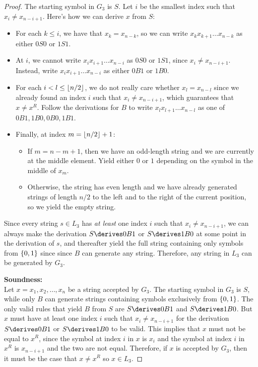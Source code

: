 \begin{Answer}
\begin{claim}
\begin{proof}
      \step
      The starting symbol in $G_3$ is $S$.
      Let $i$ be the smallest index such that $x_i \ne x_{n-i+1}$.
      Here's how we can derive $x$ from $S$:
      \begin{itemize}
        \item For each $k \le i$, we have that $x_k = x_{n-k}$,
          so we can write $x_k x_{k+1} \ldots x_{n-k}$ as either $0S0$ or $1S1$.
        \item At $i$, we cannot write $x_i x_{i+1} \ldots x_{n-i}$
          as $0S0$ or $1S1$, since $x_i \ne x_{n-i+1}$.
          Instead, write $x_i x_{i+1} \ldots x_{n-i}$ as either $0B1$ or $1B0$.
        \item For each $i < l \le \lfloor{} n/2 \rfloor$, we do not really care whether $x_l = x_{n-l}$
          since we already found an index $i$ such that $x_i \ne x_{n-i+1}$,
          which guarantees that $x \ne x^R$.
          Follow the derivations for $B$ to write $x_l x_{l+1} \ldots x_{n-l}$
          as one of $0B1, 1B0, 0B0, 1B1$.
        \item Finally, at index $m = \lfloor{} n/2 \rfloor + 1$:
          \begin{itemize}
            \item If $m = n - m + 1$, then we have an odd-length string
              and we are currently at the middle element. Yield either $0$ or $1$
              depending on the symbol in the middle of $x_m$.
            \item Otherwise, the string has even length
              and we have already generated strings of length $n/2$
              to the left and to the right of the current position,
              so we yield the empty string.
          \end{itemize}
      \end{itemize}
      Since every string $s \in L_3$ has \emph{at least} one index $i$
      such that $x_i \ne x_{n-i+1}$, we can always make the derivation
      $S \derives 0B1$ or $S \derives 1B0$ at some point in the derivation of $s$,
      and thereafter yield the full string containing only symbols from $\left\{0, 1\right\}$
      since since $B$ can generate any string.
      Therefore, any string in $L_3$ can be generated by $G_3$.

      \step
      \textbf{Soundness:} \\
      Let $x = x_1, x_2, \ldots, x_n$ be a string accepted by $G_3$.
      The starting symbol in $G_3$ is $S$,
      while only $B$ can generate strings containing symbols exclusively from $\left\{0, 1\right\}$.
      The only valid rules that yield $B$ from $S$ are
      $S \derives 0B1$ and $S \derives 1B0$.
      But $x$ must have at least one index $i$ such that $x_i \ne x_{n-i+1}$
      for the derivation $S \derives 0B1$ or $S \derives 1B0$ to be valid.
      This implies that $x$ must not be equal to $x^R$,
      since the symbol at index $i$ in $x$ is $x_i$ and the symbol at index
      $i$ in $x^R$ is $x_{n-i+1}$ and the two are not equal. 
      Therefore, if $x$ is accepted by $G_3$, then
      it must be the case that $x \ne x^R$ so $x \in L_3$.
    \end{proof}
  \end{claim}
\end{Answer}
